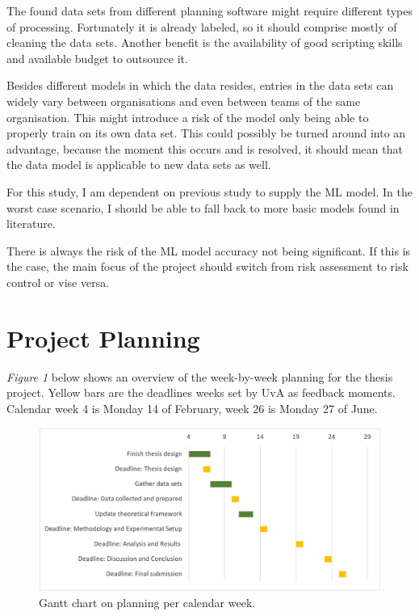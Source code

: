 \documentclass[sigconf]{acmart}
\begin{document}
The found data sets from different planning software might require different types of processing. Fortunately it is already labeled, so it should comprise mostly of cleaning the data sets. Another benefit is the availability of good scripting skills and available budget to outsource it.

Besides different models in which the data resides, entries in the data sets can widely vary between organisations and even between teams of the same organisation. This might introduce a risk of the model only being able to properly train on its own data set. This could possibly be turned around into an advantage, because the moment this occurs and is resolved, it should mean that the data model is applicable to new data sets as well.

For this study, I am dependent on previous study to supply the ML model. In the worst case scenario, I should be able to fall back to more basic models found in literature.

There is always the risk of the ML model accuracy not being significant. If this is the case, the main focus of the project should switch from risk assessment to risk control or vise versa.


\section{Project Planning}

\emph{Figure 1} below shows an overview of the week-by-week planning for the thesis project. Yellow bars are the deadlines weeks set by UvA as feedback moments. Calendar week 4 is Monday 14 of February, week 26 is Monday 27 of June. 

\begin{figure}[h]
  \centering
  \includegraphics[width=\linewidth]{gantt-planning}
  \caption{Gantt chart on planning per calendar week.}
\end{figure}








\appendix
\end{document}
